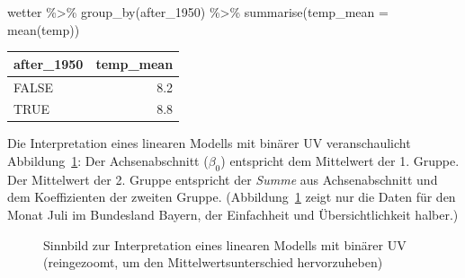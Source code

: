 \documentclass[
  letterpaper,
  twoside,
  open=any]{scrbook}
\newenvironment{Shaded}{\begin{snugshade}}{\end{snugshade}}
\newcommand{\AttributeTok}[1]{\textcolor[rgb]{0.40,0.45,0.13}{#1}}
\newcommand{\FunctionTok}[1]{\textcolor[rgb]{0.28,0.35,0.67}{#1}}
\newcommand{\NormalTok}[1]{\textcolor[rgb]{0.00,0.23,0.31}{#1}}
\newcommand{\SpecialCharTok}[1]{\textcolor[rgb]{0.37,0.37,0.37}{#1}}
\theoremstyle{definition}
\theoremstyle{definition}
\theoremstyle{definition}
\theoremstyle{remark}
\begin{document}
\begin{Shaded}
\begin{Highlighting}[]
\NormalTok{wetter }\SpecialCharTok{\%\textgreater{}\%} 
  \FunctionTok{group\_by}\NormalTok{(after\_1950) }\SpecialCharTok{\%\textgreater{}\%} 
  \FunctionTok{summarise}\NormalTok{(}\AttributeTok{temp\_mean =} \FunctionTok{mean}\NormalTok{(temp))}
\end{Highlighting}
\end{Shaded}

\begin{longtable}[]{@{}lr@{}}
\toprule\noalign{}
after\_1950 & temp\_mean \\
\midrule\noalign{}
\endhead
\bottomrule\noalign{}
\endlastfoot
FALSE & 8.2 \\
TRUE & 8.8 \\
\end{longtable}

Die Interpretation eines linearen Modells mit binärer UV veranschaulicht
Abbildung~\ref{fig-binvar}: Der Achsenabschnitt (\(\beta_0\)) entspricht
dem Mittelwert der 1. Gruppe. Der Mittelwert der 2. Gruppe entspricht
der \emph{Summe} aus Achsenabschnitt und dem Koeffizienten der zweiten
Gruppe. (Abbildung~\ref{fig-binvar} zeigt nur die Daten für den Monat
Juli im Bundesland Bayern, der Einfachheit und Übersichtlichkeit
halber.)

\begin{figure}


\caption{\label{fig-binvar}Sinnbild zur Interpretation eines linearen
Modells mit binärer UV (reingezoomt, um den Mittelwertsunterschied
hervorzuheben)}

\end{figure}%
\end{document}
